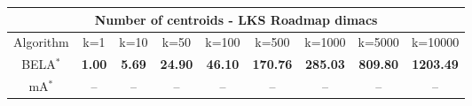 \begin{tabular}{c|cccccccc}\toprule
\multicolumn{9}{c}{Number of centroids - LKS Roadmap dimacs}\\ \midrule
Algorithm & k=1 & k=10 & k=50 & k=100 & k=500 & k=1000 & k=5000 & k=10000 \\ \midrule
BELA$^*$ & \textbf{1.00} & \textbf{5.69} & \textbf{24.90} & \textbf{46.10} & \textbf{170.76} & \textbf{285.03} & \textbf{809.80} & \textbf{1203.49} \\
mA$^*$ & -- & -- & -- & -- & -- & -- & -- & -- \\ \bottomrule 
\end{tabular}
